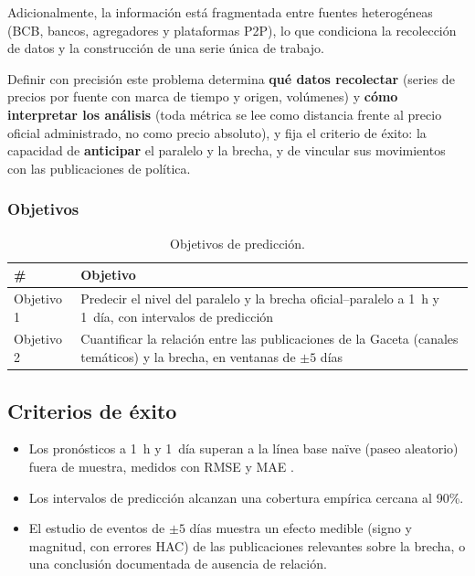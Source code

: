 Adicionalmente, la información está fragmentada entre fuentes heterogéneas
(BCB, bancos, agregadores y plataformas P2P), lo que condiciona la recolección
de datos y la construcción de una serie única de trabajo.

Definir con precisión este problema determina \textbf{qué datos recolectar}
(series de precios por fuente con marca de tiempo y origen, volúmenes) y
\textbf{cómo interpretar los análisis} (toda métrica se lee
como distancia frente al precio oficial administrado, no como precio absoluto),
y fija el criterio de éxito: la capacidad de \textbf{anticipar} el paralelo y
la brecha, y de vincular sus movimientos con las publicaciones de política.

\subsubsection{Objetivos}

\begin{table}[!ht]
\centering\small
\begin{tabular}{@{}p{}p{}@{}}
\toprule
\# & Objetivo \\
\midrule
Objetivo 1 & Predecir el nivel del paralelo y la brecha oficial--paralelo a
      1~h y 1~día, con intervalos de predicción \\
Objetivo 2 & Cuantificar la relación entre las publicaciones de la Gaceta
      (canales temáticos) y la brecha, en ventanas de $\pm5$ días \\
\bottomrule
\end{tabular}
\caption{Objetivos de predicción.}
\label{tab:objetivos}
\end{table}

\subsection{Criterios de éxito}

\begin{itemize}
  \item Los pronósticos a 1~h y 1~día superan a la línea base naïve (paseo
        aleatorio) fuera de muestra, medidos con RMSE y MAE
        \cite{makridakis2020m4}.
  \item Los intervalos de predicción alcanzan una cobertura empírica cercana
        al 90\%.
  \item El estudio de eventos de $\pm5$ días muestra un efecto medible (signo y
        magnitud, con errores HAC) de las publicaciones relevantes sobre la
        brecha, o una conclusión documentada de ausencia de relación.
\end{itemize}

